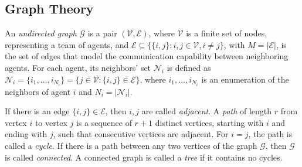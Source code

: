 \subsection{Graph Theory}
An \textit{undirected graph} $\mathcal{G}$ is a pair
$(\mathcal{V}, \mathcal{E})$, where $\mathcal{V}$ is a finite set of nodes,
representing a team of agents, and
$\mathcal{E} \subseteq \big\{ \{i,j\} : i,j \in \mathcal{V}, i \neq j \big\}$,
with $M = |\mathcal{E}|$, is the set of edges that model the communication
capability between neighboring agents. For each agent, its neighbors' set
$\mathcal{N}_i$ is defined as
$\mathcal{N}_i = \{i_1, \ldots, i_{N_i}\} = \big\{ j \in \mathcal{V} : \{i,j\} \in \mathcal{E}\big\}$,
where $i_1, \ldots, i_{N_i}$ is an enumeration of the neighbors of agent $i$
and $N_i = |\mathcal N_i|$.

If there is an edge $\{i, j\} \in \mathcal{E}$, then $i, j$ are called
\textit{adjacent}. A \textit{path} of length $r$ from vertex $i$ to vertex
$j$ is a sequence of $r+1$ distinct vertices, starting with $i$ and ending
with $j$, such that consecutive vertices are adjacent. For $i = j$, the path
is called a \textit{cycle}. If there is a path between any two vertices of the
graph $\mathcal{G}$, then $\mathcal{G}$ is called \textit{connected}.
A connected graph is called a \textit{tree} if it contains no cycles.
